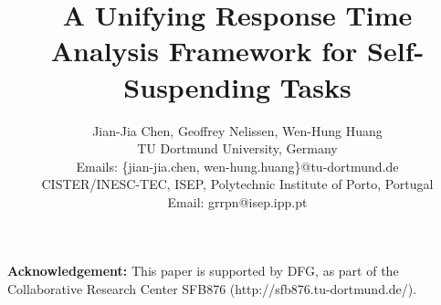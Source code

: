 \documentclass[10pt,conference,preprint]{IEEEtran}
\begin{document}
  
\title{A Unifying Response Time Analysis Framework for Self-Suspending Tasks}

\author{Jian-Jia Chen, Geoffrey Nelissen, Wen-Hung Huang\\
 TU Dortmund University, Germany\\
Emails: \{jian-jia.chen, wen-hung.huang\}@tu-dortmund.de\\
 CISTER/INESC-TEC, ISEP, Polytechnic Institute of Porto, Portugal \\
Email: grrpn@isep.ipp.pt
}

\maketitle

\begin{abstract}
  
\end{abstract}



































{\bf Acknowledgement:} This paper is supported by DFG, as part of the Collaborative Research Center SFB876 (http://sfb876.tu-dortmund.de/).

{}
\end{document}
